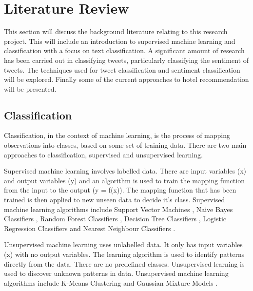 \chapter{Literature Review}

This section will discuss the background literature relating to this research project. This will include an introduction to supervised machine learning and classification with a focus on text classification. 
A significant amount of research has been carried out in classifying tweets, particularly classifying the sentiment of tweets. The techniques used for tweet classification and sentiment classification will be explored. Finally some of the current approaches to hotel recommendation will be presented.

\section{Classification}

Classification, in the context of machine learning, is the process of mapping observations into classes, based on some set of training data. There are two main approaches to classification, supervised and unsupervised learning. 

Supervised machine learning \cite{supervised2007} involves labelled data. There are input variables (x) and output variables (y) and an algorithm is used to train the mapping function from the input to the output (y = f(x)). The mapping function that has been trained is then applied to new unseen data to decide it's class. Supervised machine learning algorithms include Support Vector Machines \cite{Vapnik1995,Vapnik21995}, Naive Bayes Classifiers \cite{NaiveBayes1998}, Random Forest Classifiers \cite{Breiman2001}, Decision Tree Classifiers \cite{decisionTrees1991}, Logistic Regression Classifiers \cite{logisticRegression2007} and Nearest Neighbour Classifiers \cite{knn2001}. 

Unsupervised machine learning uses unlabelled data. It only has input variables (x) with no output variables. The learning algorithm is used to identify patterns directly from the data. There are no predefined classes. Unsupervised learning is used to discover unknown patterns in data. Unsupervised machine learning algorithms include K-Means Clustering \cite{kmeans2002} and Gaussian Mixture Models \cite{}. 

